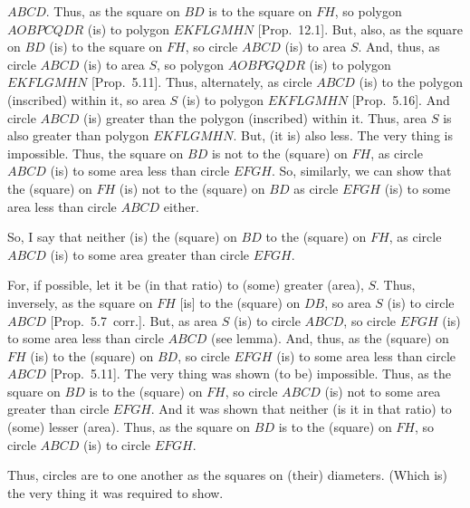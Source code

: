 \begin{Parallel}{}{}
{ $ABCD$. Thus, as the square on $BD$ is to the square on $FH$, so
polygon $AOBPCQDR$ (is) to polygon $EKFLGMHN$ [Prop.~12.1]. But, also, as the square on $BD$ (is) to the square on $FH$, so circle $ABCD$ (is) to area $S$. And, thus, as
circle $ABCD$ (is) to area $S$, so polygon $AOBPGQDR$ (is) to
polygon $EKFLGMHN$ [Prop.~5.11]. Thus, alternately, as circle $ABCD$
(is) to the polygon (inscribed) within it, so area $S$ (is) to polygon $EKFLGMHN$
[Prop.~5.16]. And circle $ABCD$ (is)
greater than the polygon (inscribed) within it. Thus, area $S$ is also greater than polygon 
$EKFLGMHN$. But, (it is) also less. The very thing
is impossible. Thus, the square on $BD$ is not to the (square) on $FH$, as
circle $ABCD$ (is) to some area less than circle $EFGH$. So, similarly,
we can show that the (square) on $FH$ (is) not to the (square) on 
$BD$ as circle $EFGH$ (is) to some area less than circle $ABCD$ either.

So, I say that neither (is) the (square) on $BD$ to the (square) on $FH$,
as circle $ABCD$ (is) to some area greater than circle $EFGH$.

For, if possible, let it be (in that ratio) to (some)  greater (area), $S$. Thus, inversely, 
as the square on $FH$ [is] to the (square) on $DB$, so area $S$ (is) to circle $ABCD$ [Prop.~5.7~corr.]. But, as area $S$ (is) to circle $ABCD$, so circle $EFGH$
(is) to some area less than circle $ABCD$ (see lemma). And, thus, as the (square) on $FH$ (is) to the (square) on $BD$, so circle $EFGH$ (is) to some area
less than  circle $ABCD$ [Prop.~5.11]. The very thing was shown (to be) impossible.
Thus, as the square on $BD$ is to the (square) on $FH$, so circle $ABCD$
(is) not to some area greater than circle $EFGH$. And it was shown that neither (is it in that ratio) to (some) lesser (area). Thus, as the square on $BD$ is to the (square) on $FH$, so circle $ABCD$ (is) to circle $EFGH$.

Thus, circles are to one another as the squares on (their) diameters. (Which is) the very thing it was required to show.}
\end{Parallel}

